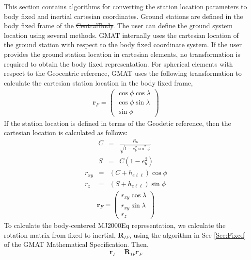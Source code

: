 This section contains algorithms for converting the station location
parameters to body fixed and inertial cartesian coordinates. Ground
stations are defined in the body fixed frame of the
\st{CentralBody}. The user can define the ground system location
using several methods.  GMAT internally uses the cartesian location
of the ground station with respect to the body fixed coordinate
system. If the user provides the ground station location in
cartesian elements, no transformation is required to obtain the body
fixed representation. For spherical elements with respect to the
Geocentric reference, GMAT uses the following transformation to
calculate the cartesian station location in the body fixed frame,
%
\begin{eqnarray}
    \mathbf{r}_F = \left(
        \begin{array}{cc}
          \cos{\phi}\cos{\lambda}\\
          \cos{\phi}\sin{\lambda}\\
          \sin{\phi}
          \end{array}
          \right)
\end{eqnarray}
%
If the station location is defined in terms of the Geodetic
reference, then the cartesian location is calculated as
follows\cite{Vallado}:
%
\begin{eqnarray}
    C &=& \displaystyle\frac{R_b}{\sqrt{1 - e_b^2\sin^2{\phi}}}\\
%
    S &=& C\left(1 - e_b^2\right)
\end{eqnarray}
%
\begin{eqnarray}
    r_{xy} &=& \left( C + h_{e\ell\ell}\right)\cos{\phi}\\
%
    r_{z} &=& \left( S + h_{e\ell\ell}\right)\sin{\phi}
\end{eqnarray}
%
\begin{eqnarray}
    \mathbf{r}_F = \left(
        \begin{array}{cc}
          r_{xy}\cos{\lambda}\\
          r_{xy}\sin{\lambda}\\
          r_{z}
          \end{array}
          \right)
\end{eqnarray}
%
To calculate the body-centered MJ2000Eq representation, we calculate
the rotation matrix from fixed to inertial, $\mathbf{R}_{IF}$, using
the algorithm in Sec \ref{Sec:Fixed} of the GMAT Mathematical
Specification. Then,
%
\begin{equation}
    \mathbf{r}_I = \mathbf{R}_{IF}\mathbf{r}_F
\end{equation}

